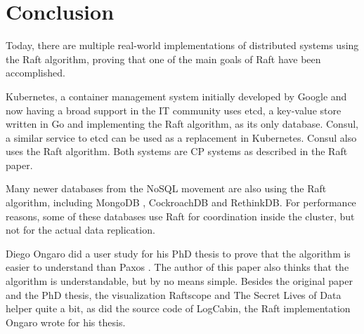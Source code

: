 \section{Conclusion}
Today, there are multiple real-world implementations of distributed systems using the Raft algorithm, proving that one of the main goals of Raft have been accomplished.

Kubernetes, a container management system initially developed by Google and now having a broad support in the IT community uses etcd, a key-value store written in Go and implementing the Raft algorithm, as its only database. Consul, a similar service to etcd can be used as a replacement in Kubernetes. Consul also uses the Raft algorithm.
Both systems are CP systems as described in the Raft paper.

Many newer databases from the NoSQL movement are also using the Raft algorithm, including MongoDB \cite{mongodb_raft}, CockroachDB\cite{cockroachdb_raft} and RethinkDB\cite{rethinkdb_raft}. For performance reasons, some of these databases use Raft for coordination inside the cluster, but not for the actual data replication\cite[Development section]{rethinkdb_raft_metadata}.

Diego Ongaro did a user study for his PhD thesis to prove that the algorithm is easier to understand than Paxos \cite[Raft user study chapter]{raft_phd_thesis}. The author of this paper also thinks that the algorithm is understandable, but by no means simple. Besides the original paper and the PhD thesis, the visualization Raftscope \cite{raftscope} and The Secret Lives of Data \cite{the_secret_lives_of_data} helper quite a bit, as did the source code of LogCabin\cite{logcabin}, the Raft implementation Ongaro wrote for his thesis.


 


